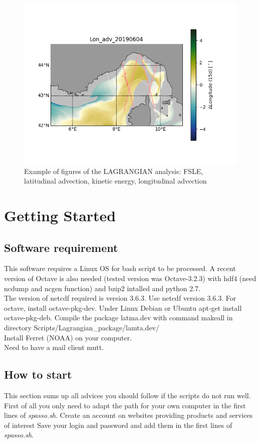 \documentclass[12pt,a4paper]{article}
\begin{document}
\begin{figure}[h!]
\includegraphics[scale=0.5]{Figures/Lon_adv.png}
\caption{Example of figures of the LAGRANGIAN analysis: FSLE, latitudinal advection, kinetic energy, longitudinal advection}
\end{figure}

\newpage
\section{Getting Started}
\subsection{Software requirement}
This software requires a Linux OS for bash script to be processed. A recent version of Octave is also needed (tested version was Octave-3.2.3) with hdf4 (need ncdump and ncgen function) and bzip2 intalled and python 2.7.\\
The version of netcdf required is version 3.6.3. Use netcdf version 3.6.3.
For octave, install octave-pkg-dev. Under Linux Debian or Ubuntu apt-get install octave-pkg-deb. Compile the package latma.dev with command makeall in directory Scripts/Lagrangian\_package/lamta.dev/\\
Install Ferret (NOAA) on your computer.\\
Need to have a mail client mutt.\\

\subsection{How to start}
This section sums up all advices you should follow if the scripts do not run well.\\
First of all you only need to adapt the path for your own computer in the first lines of \textit{spasso.sh}. 
Create an account on websites providing products and services of interest
Save your login and password and add them in the first lines of \textit{spasso.sh}. \\
\end{document}
